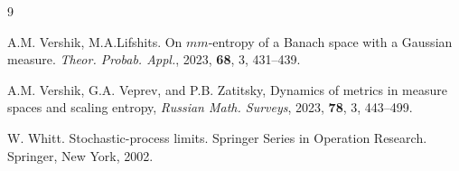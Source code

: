 \documentclass[12pt]{article}
\theoremstyle{definition}
\begin{document}
\begin{thebibliography}{9}
{
A.M. Vershik, M.A.Lifshits. On $mm$-entropy of a Banach space with a Gaussian measure. 
\emph{Theor. Probab. Appl.}, 2023, {\bf 68}, 3, 431--439.

A.M. Vershik, G.A. Veprev, and P.B. Zatitsky, Dynamics of metrics in measure spaces and scaling entropy, \emph{Russian Math. Surveys}, 2023, {\bf 78}, 3, 443--499.


W. Whitt. Stochastic-process limits. Springer Series in Operation Research. Springer, New York, 2002.

} %
\end{thebibliography}
\end{document}
